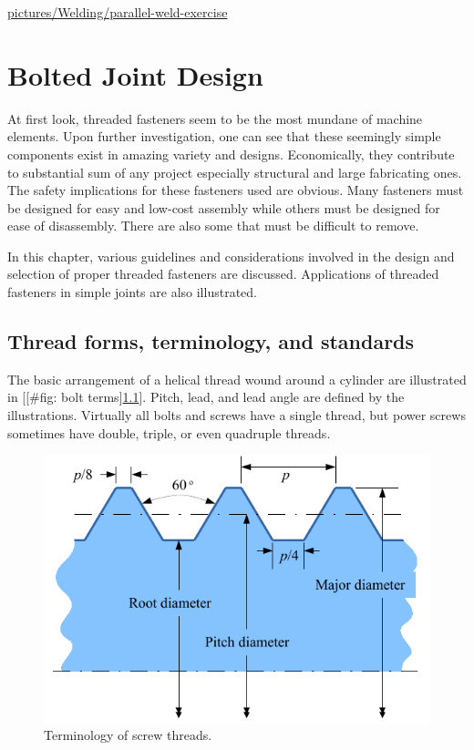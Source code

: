 \documentclass[a4paper,openany,12pt]{book}
\begin{document}
{{\url{pictures/Welding/parallel-weld-exercise}

\chapter{Bolted Joint Design}
\label{bolted-joint-design}
At first look, threaded fasteners seem to be the most mundane of machine
elements. Upon further investigation, one can see that these seemingly
simple components exist in amazing variety and designs. Economically,
they contribute to substantial sum of any project especially structural
and large fabricating ones. The safety implications for these fasteners
used are obvious. Many fasteners must be designed for easy and low-cost
assembly while others must be designed for ease of disassembly. There
are also some that must be difficult to remove.

In this chapter, various guidelines and considerations involved in the
design and selection of proper threaded fasteners are discussed.
Applications of threaded fasteners in simple joints are also
illustrated.

\section{Thread forms, terminology, and standards}
\label{thread-forms-terminology-and-standards}
The basic arrangement of a helical thread wound around a cylinder are
illustrated in [[\#fig: bolt terms]\ref{fig: bolt terms}]. Pitch, lead, and
lead angle are defined by the illustrations. Virtually all bolts and
screws have a single thread, but power screws sometimes have double,
triple, or even quadruple threads.


\begin{figure}[htbp]
\centering
\includegraphics[width=.9\linewidth]{pictures/Bolt/bolt-terminology.pdf}
\caption{\label{fig: bolt terms}
Terminology of screw threads.}
\end{figure}

}}
\end{document}
